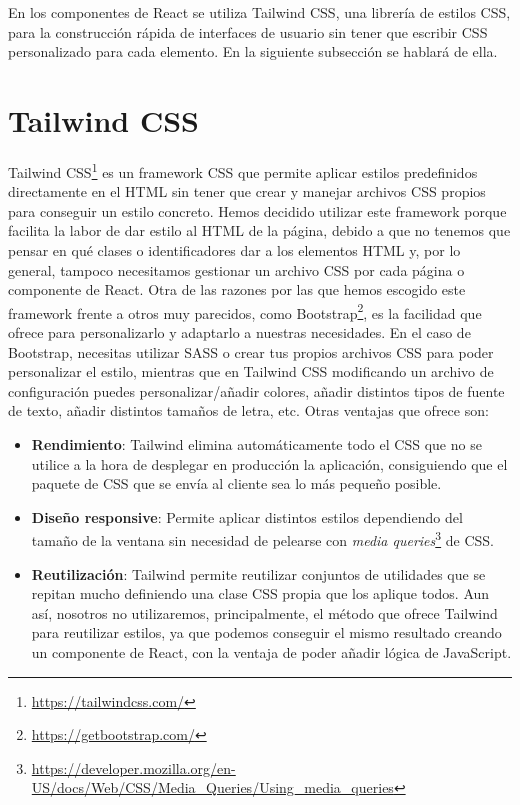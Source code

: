 En los componentes de React se utiliza Tailwind CSS, una librería de estilos CSS, para la construcción rápida de interfaces de usuario sin tener que escribir CSS personalizado para cada elemento. En la siguiente subsección se hablará de ella.

\section{Tailwind CSS}\label{sec:tailwind}
Tailwind CSS\footnote{\url{https://tailwindcss.com/}} es un framework CSS que permite aplicar estilos predefinidos directamente en el HTML sin tener que crear y manejar archivos CSS propios para conseguir un estilo concreto. Hemos decidido utilizar este framework porque facilita la labor de dar estilo al HTML de la página, debido a que no tenemos que pensar en qué clases o identificadores dar a los elementos HTML y, por lo general, tampoco necesitamos gestionar un archivo CSS por cada página o componente de React. Otra de las razones por las que hemos escogido este framework frente a otros muy parecidos, como Bootstrap\footnote{\url{https://getbootstrap.com/}}, es la facilidad que ofrece para personalizarlo y adaptarlo a nuestras necesidades. En el caso de Bootstrap, necesitas utilizar SASS o crear tus propios archivos CSS para poder personalizar el estilo, mientras que en Tailwind CSS modificando un archivo de configuración puedes personalizar/añadir colores, añadir distintos tipos de fuente de texto, añadir distintos tamaños de letra, etc. Otras ventajas que ofrece son:
\begin{itemize}
  \item \textbf{Rendimiento}: Tailwind elimina automáticamente todo el CSS que no se utilice a la hora de desplegar en producción la aplicación, consiguiendo que el paquete de CSS que se envía al cliente sea lo más pequeño posible.
  \item \textbf{Diseño responsive}: Permite aplicar distintos estilos dependiendo del tamaño de la ventana sin necesidad de pelearse con \textit{media queries}\footnote{\url{https://developer.mozilla.org/en-US/docs/Web/CSS/Media_Queries/Using_media_queries}} de CSS.
  \item \textbf{Reutilización}: Tailwind permite reutilizar conjuntos de utilidades que se repitan mucho definiendo una clase CSS propia que los aplique todos. Aun así, nosotros no utilizaremos, principalmente, el método que ofrece Tailwind para reutilizar estilos, ya que podemos conseguir el mismo resultado creando un componente de React, con la ventaja de poder añadir lógica de JavaScript.
\end{itemize}

